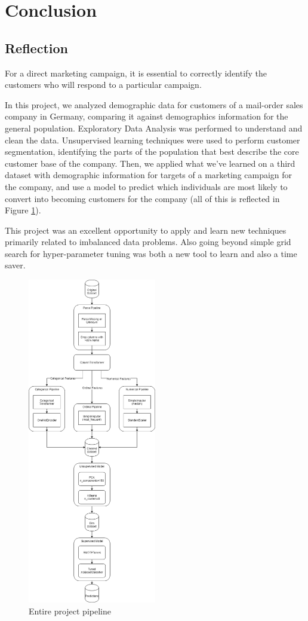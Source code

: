\section{Conclusion}

\subsection{Reflection}

For a direct marketing campaign, it is essential to correctly identify the customers who will respond to a particular campaign.

In this project, we analyzed demographic data for customers of a mail-order sales company in Germany, comparing it against demographics information for the general population. Exploratory Data Analysis was performed to understand and clean the data. Unsupervised learning techniques were used to perform customer segmentation, identifying the parts of the population that best describe the core customer base of the company. Then, we applied what we've learned on a third dataset with demographic information for targets of a marketing campaign for the company, and use a model to predict which individuals are most likely to convert into becoming customers for the company (all of this is reflected in Figure \ref{fig:final_pipeline}).

This project was an excellent opportunity to apply and learn new techniques primarily related to imbalanced data problems. Also going beyond simple grid search for hyper-parameter tuning was both a new tool to learn and also a time saver.

\begin{figure}[h]
\centering
\includegraphics[width=0.5\textwidth, height=0.8\textwidth]{images/final_pipeline.png}
\caption{Entire project pipeline}
\label{fig:final_pipeline}
\end{figure}

